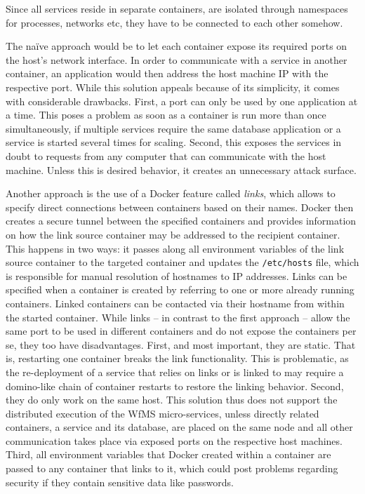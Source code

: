   Since all services reside in separate containers, \ie are isolated through namespaces for processes, networks etc, they have to be connected to each other somehow.

  The naïve approach would be to let each container expose its required ports on the host's network interface. In order to communicate with a service in another container, an application would then address the host machine \ac{IP} with the respective port. While this solution appeals because of its simplicity, it comes with considerable drawbacks.
  First, a port can only be used by one application at a time. This poses a problem as soon as a container is run more than once simultaneously, \eg if multiple services require the same database application or a service is started several times for scaling.
  Second, this exposes the services in doubt to requests from any computer that can communicate with the host machine. Unless this is desired behavior, it creates an unnecessary attack surface.

  Another approach is the use of a Docker feature called \emph{links}, which allows to specify direct connections between containers based on their names.
  Docker then creates a secure tunnel between the specified containers and provides information on how the link source container may be addressed to the recipient container. This happens in two ways: it passes along all environment variables of the link source container to the targeted container and updates the \texttt{/etc/hosts} file, which is responsible for manual resolution of hostnames to \ac{IP} addresses.
  Links can be specified when a container is created by referring to one or more already running containers.
  Linked containers can be contacted via their hostname from within the started container.
  While links -- in contrast to the first approach -- allow the same port to be used in different containers and do not expose the containers per se, they too have disadvantages.
  First, and most important, they are static. That is, restarting one container breaks the link functionality. This is problematic, as the re-deployment of a service that relies on links or is linked to may require a domino-like chain of container restarts to restore the linking behavior.
  Second, they do only work on the same host. This solution thus does not support the distributed execution of the \ac{WfMS} micro-services, unless directly related containers, \eg a service and its database, are placed on the same node and all other communication takes place via exposed ports on the respective host machines.
  Third, \ac{all} environment variables that Docker created within a container are passed to any container that links to it, which could post problems regarding security if they contain sensitive data like passwords.

